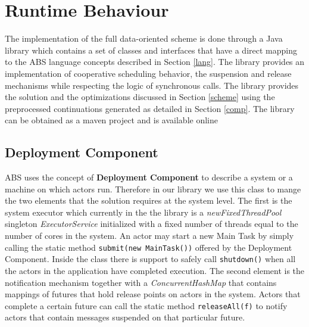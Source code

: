\section{Runtime Behaviour}
\label{run}
The implementation of the full data-oriented scheme is done through a Java library which contains a set of classes and interfaces that have a direct mapping to the ABS language concepts described in Section \ref{lang}. The library provides an implementation of cooperative scheduling behavior, the suspension and release mechanisms while respecting the logic of synchronous calls. The library provides the solution and the optimizations discussed in Section \ref{scheme} using the preprocessed continuations generated as detailed in Section \ref{comp}. The library can be obtained as a maven project and is available online\cite{library}

\subsection{Deployment Component}
ABS uses the concept of \textbf{Deployment Component} to describe a system or a machine on which actors run. Therefore in our library we use this class to mange the two elements that the solution requires at the system level. The first is the system executor which currently in the the library is a \textit{newFixedThreadPool} singleton \textit{ExecutorService} initialized with a fixed number of threads equal to the number of cores in the system. An actor may start a new Main Task by simply calling the static method \lstinline|submit(new MainTask())| offered by the Deployment Component. Inside the class there is support to safely call \lstinline|shutdown()| when all the actors in the application have completed execution. The second element is the notification mechanism together with a \textit{ConcurrentHashMap} that contains mappings of futures that hold release points on actors in the system. Actors that complete a certain future can call the static method \lstinline|releaseAll(f)| to notify actors that contain messages suspended on that particular future. 



